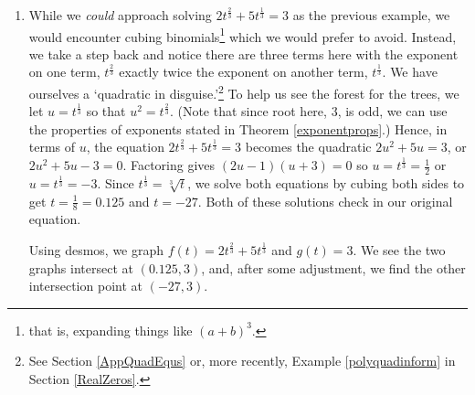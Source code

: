 \documentclass{ximera}
\begin{document}
\begin{example}
\begin{enumerate}
We square both sides \textit{again} and get $(5x-26)^2 = (4\sqrt{7-x})^2$ which reduces to $25x^2-260x+676 = 16(7-x)$. At last, we have a quadratic equation which we can solve by setting to zero and factoring.  We get  $25x^2-244x+564 = 0$, so $(x-6)(25x-94) = 0$ so $x = 6$ or $x = \frac{94}{25} = 3.76$.  When we go to check these answers, we find $x=6$ does check, but $x = 3.76$ does not. Hence, $x=3.76$ is an `extraneous' solution.\footnote{We invite the reader to see at which point in our machinations $x=3.76$ \textit{does} check.  Knowing a solution is extraneous is one thing;  understanding \textit{how} it came about is another.}

We graph both $f(x) = \sqrt{x+3}$ and $g(x) = 2\sqrt{7-x} + 1$ below using desmos and confirm there is only one intersection point, $(6,3)$.

\begin{center}
\end{center}

\item  While we \textit{could} approach solving  $2t^{\frac{2}{3}} + 5t^{\frac{1}{3}} = 3$ as the previous example, we would encounter cubing binomials\footnote{that is, expanding things like $(a+b)^3$.} which we would prefer to avoid.  Instead, we take a step back and notice there are three terms here with the exponent on one term, $t^{\frac{2}{3}}$ exactly twice the exponent on another term, $t^{\frac{1}{3}}$.  We have ourselves a `quadratic in disguise.'\footnote{See Section \ref{AppQuadEqus} or, more recently, Example \ref{polyquadinform} in Section \ref{RealZeros}.} To help us see the forest for the trees, we let $u = t^{\frac{1}{3}}$ so that $u^2 = t^{\frac{2}{3}}$. (Note that since root here, $3$, is odd, we can use the properties of exponents stated in Theorem \ref{exponentprops}.)  Hence, in terms of $u$, the equation   $2t^{\frac{2}{3}} + 5t^{\frac{1}{3}} = 3$ becomes the quadratic $2u^2 + 5u = 3$, or $2u^2 + 5u - 3 = 0$.  Factoring gives $(2u-1)(u+3) = 0$ so $u = t^{\frac{1}{3}} = \frac{1}{2}$ or $u = t^{\frac{1}{3}} = -3$.  Since $t^{\frac{1}{3}} = \sqrt[3]{t}$, we solve both equations by cubing both sides to get $t = \frac{1}{8} = 0.125$ and $t = -27$.  Both of these solutions check in our original equation.  

Using desmos, we graph $f(t) = 2t^{\frac{2}{3}} + 5t^{\frac{1}{3}}$ and $g(t) = 3$. We see the two graphs intersect at $(0.125,3)$, and, after some adjustment, we find the other intersection point at $(-27,3)$.


\end{enumerate}
\end{example}
\end{document}
